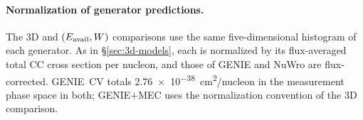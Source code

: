 \paragraph{Normalization of generator predictions.} The 3D and $(E_{\mathrm{avail}},W)$ comparisons use the same five-dimensional histogram of each generator. As in \S\ref{sec:3d-models}, each is normalized by its flux-averaged total CC cross section per nucleon, and those of GENIE and NuWro are flux-corrected. GENIE~CV totals \SI{2.76e-38}{cm^2/nucleon} in the measurement phase space in both; GENIE$+$MEC uses the normalization convention of the 3D comparison.

